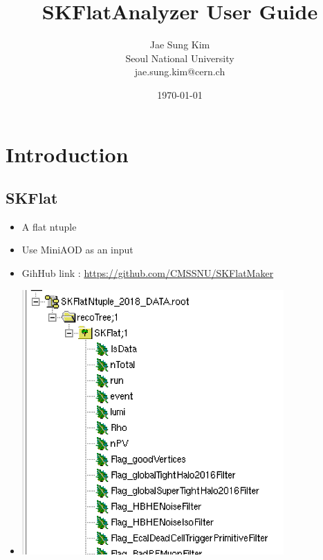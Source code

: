 \documentclass[12pt, a4paper, titlepage]{article}
\title{SKFlatAnalyzer User Guide}
\author{Jae Sung Kim  \\
  Seoul National University \\
  jae.sung.kim@cern.ch
}
\date{\today}
\begin{document}
\hypersetup{pageanchor=false}

\maketitle

\tableofcontents

\clearpage

\section{Introduction}

\subsection{SKFlat}
\begin{itemize}
\item A flat ntuple
\item Use MiniAOD as an input
\item GihHub link : \href{https://github.com/CMSSNU/SKFlatMaker}{https://github.com/CMSSNU/SKFlatMaker}
\item
  \begin{minipage}{\linewidth}
    \centering
    \includegraphics[width=10cm]{Figures/TreeContent.png}
  \end{minipage}
\end{itemize}
\end{document}
